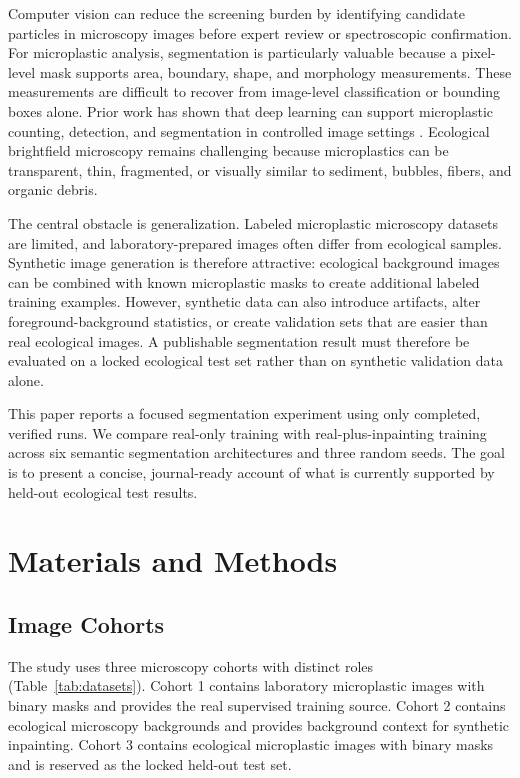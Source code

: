 \documentclass[11pt]{article}
\begin{document}
Computer vision can reduce the screening burden by identifying candidate particles in microscopy images before expert review or spectroscopic confirmation. For microplastic analysis, segmentation is particularly valuable because a pixel-level mask supports area, boundary, shape, and morphology measurements. These measurements are difficult to recover from image-level classification or bounding boxes alone. Prior work has shown that deep learning can support microplastic counting, detection, and segmentation in controlled image settings \cite{lorenzo2021,park2022mpnet,shi2022sem,hao2024,yao2025}. Ecological brightfield microscopy remains challenging because microplastics can be transparent, thin, fragmented, or visually similar to sediment, bubbles, fibers, and organic debris.

The central obstacle is generalization. Labeled microplastic microscopy datasets are limited, and laboratory-prepared images often differ from ecological samples. Synthetic image generation is therefore attractive: ecological background images can be combined with known microplastic masks to create additional labeled training examples. However, synthetic data can also introduce artifacts, alter foreground-background statistics, or create validation sets that are easier than real ecological images. A publishable segmentation result must therefore be evaluated on a locked ecological test set rather than on synthetic validation data alone.

This paper reports a focused segmentation experiment using only completed, verified runs. We compare real-only training with real-plus-inpainting training across six semantic segmentation architectures and three random seeds. The goal is to present a concise, journal-ready account of what is currently supported by held-out ecological test results.

\section{Materials and Methods}

\subsection{Image Cohorts}

The study uses three microscopy cohorts with distinct roles (Table~\ref{tab:datasets}). Cohort 1 contains laboratory microplastic images with binary masks and provides the real supervised training source. Cohort 2 contains ecological microscopy backgrounds and provides background context for synthetic inpainting. Cohort 3 contains ecological microplastic images with binary masks and is reserved as the locked held-out test set.
\end{document}
